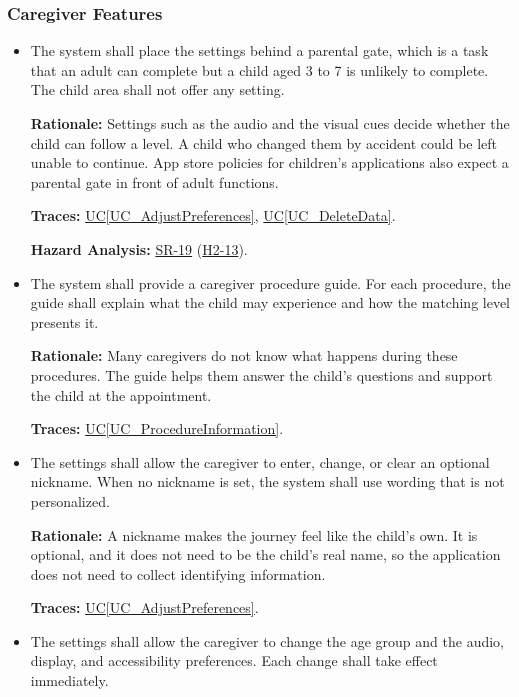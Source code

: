 \documentclass[12pt]{article}
\newcommand{\ucref}[1]{\hyperref[#1]{UC\ref*{#1}}}
\newcounter{reqnum} %
\newcommand{\haurl}{https://team-hindsight.github.io/ophthamology-game/HazardAnalysis/HazardAnalysis.pdf}
\newcommand{\hasrref}[2]{\href{\haurl\#nameddest=sr:#1}{SR-#2}}
\newcommand{\hahazref}[2]{\href{\haurl\#nameddest=haz:#1}{H#2}}
\newcommand{\hazsr}[4]{\hasrref{#1}{#2} (\hahazref{#3}{#4})}
\begin{document}
\subsubsection{Caregiver Features}
\label{sec_FRCaregiver}

\begin{itemize}

\item[\refstepcounter{reqnum}\textbf{FR\thereqnum}\label{FR_ParentGate}:]
The system shall place the settings behind a parental gate, which is a
task that an adult can complete but a child aged 3 to 7 is unlikely to
complete. The child area shall not offer any setting.

\textbf{Rationale:} Settings such as the audio and the visual cues decide whether the child
can follow a level. A child who changed them by accident could be left unable
to continue. App store policies for children's applications also expect a
parental gate in front of adult functions.

\textbf{Traces:} \ucref{UC_AdjustPreferences}, \ucref{UC_DeleteData}.

\textbf{Hazard Analysis:} \hazsr{VisualCuesSetting}{19}{VisualCuesDisabledSetting}{2-13}.

\item[\refstepcounter{reqnum}\textbf{FR\thereqnum}\label{FR_ProcedureGuide}:]
The system shall provide a caregiver procedure guide. For each procedure, the
guide shall explain what the child may experience and how the matching level
presents it.

\textbf{Rationale:} Many caregivers do not know what happens during these
procedures. The guide helps them answer the child's questions and support the
child at the appointment.

\textbf{Traces:} \ucref{UC_ProcedureInformation}.

\item[\refstepcounter{reqnum}\textbf{FR\thereqnum}\label{FR_Nickname}:]
The settings shall allow the caregiver to enter, change, or clear an optional
nickname. When no nickname is set, the system shall use wording that is not
personalized.

\textbf{Rationale:} A nickname makes the journey feel like the child's own. It
is optional, and it does not need to be the child's real name, so the
application does not need to collect identifying information.

\textbf{Traces:} \ucref{UC_AdjustPreferences}.

\item[\refstepcounter{reqnum}\textbf{FR\thereqnum}\label{FR_Preferences}:]
The settings shall allow the caregiver to change the age group and the audio,
display, and accessibility preferences. Each change shall take effect
immediately.


\end{itemize}
\end{document}
